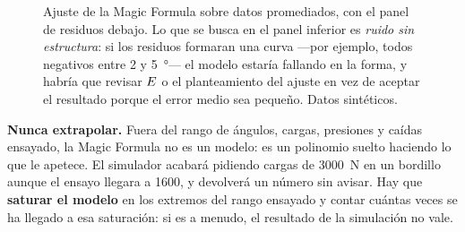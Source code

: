 \begin{figure}[htbp]
\centering
{}

\caption[Ajuste de la Magic Formula y residuos]{Ajuste de la Magic Formula sobre
datos promediados, con el panel de residuos debajo. Lo que se busca en el panel
inferior es \emph{ruido sin estructura}: si los residuos formaran una curva
---por ejemplo, todos negativos entre \num{2} y \SI{5}{\degree}--- el modelo
estaría fallando en la forma, y habría que revisar $E$ o el planteamiento del
ajuste en vez de aceptar el resultado porque el error medio sea pequeño. Datos
sintéticos.}
\label{fig:modelado:ajuste}
\end{figure}

\begin{ojo}
\textbf{Nunca extrapolar.} Fuera del rango de ángulos, cargas, presiones y caídas
ensayado, la Magic Formula no es un modelo: es un polinomio suelto haciendo lo
que le apetece. El simulador acabará pidiendo cargas de \SI{3000}{\newton} en un
bordillo aunque el ensayo llegara a \num{1600}, y devolverá un número sin avisar.
Hay que \textbf{saturar el modelo} en los extremos del rango ensayado y contar
cuántas veces se ha llegado a esa saturación: si es a menudo, el resultado de la
simulación no vale.
\end{ojo}

